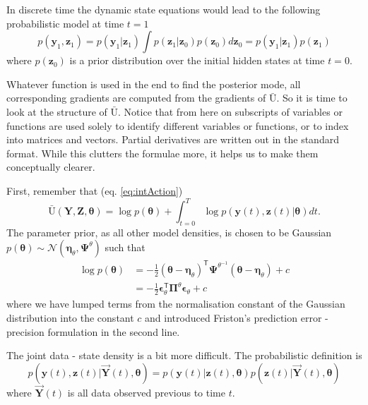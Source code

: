 \documentclass[a4paper,10pt]{article}
\newcommand{\bs}[1]{\mathbf{#1}}					%
\newcommand{\bgs}[1]{\boldsymbol{#1}}				%
\newcommand{\tr}{\mathsf{T}}				%
\newcommand{\eq}[1]{\begin{equation} #1 \end{equation}}%
\renewcommand{\ss}{z}         %
\newcommand{\so}{y}         %
\newcommand{\spe}{\epsilon} %
\renewcommand{\sp}{\theta}    %
\newcommand{\ps}{\bs{\ss}}    %
\newcommand{\po}{\bs{\so}}    %
\newcommand{\ppe}{\bgs{\spe}} %
\newcommand{\pp}{\bgs{\sp}} %
\newcommand{\Ps}{\bs{Z}}    %
\newcommand{\Po}{\bs{Y}}    %
\newcommand{\Ua}{\bar{\mathrm{U}}}		%
\newcommand{\N}{\mathcal{N}}			%
\newcommand{\Prec}{\bgs{\Pi}}			%
\begin{document}
In discrete time the dynamic state equations would lead to the following probabilistic model at time $t=1$
\eq{
    p(\po_1, \ps_1) = p(\po_1| \ps_1)\int p(\ps_1|\ps_0)p(\ps_0) d\ps_0 = p(\po_1| \ps_1)p(\ps_1)
}
where $p(\ps_0)$ is a prior distribution over the initial hidden states at time $t=0$.

Whatever function is used in the end to find the posterior mode, all corresponding gradients are computed from the gradients of $\Ua$. So it is time to look at the structure of $\Ua$. Notice that from here on subscripts of variables or functions are used solely to identify different variables or functions, or to index into matrices and vectors. Partial derivatives are written out in the standard format. While this clutters the formulae more, it helps us to make them conceptually clearer.

First, remember that (eq. \ref{eq:intAction})
\[
    \Ua(\Po,\Ps,\pp) = \log p(\pp) + \int_{t=0}^T \log p(\po(t),\ps(t)|\pp)dt.
\]
The parameter prior, as all other model densities, is chosen to be Gaussian $p(\pp)\sim \N(\bgs{\eta}_\sp,\bgs{\Psi}^\sp)$ such that 
\begin{align}
    \log p(\pp) &= -\frac{1}{2}(\pp - \bgs{\eta}_\sp)^\tr\bgs{\Psi}^{\sp^{-1}}(\pp - \bgs{\eta}_\sp) + c\\
    &= -\frac{1}{2}\ppe_\sp^\tr\Prec^{\sp}\ppe_\sp + c
\end{align}
where we have lumped terms from the normalisation constant of the Gaussian distribution into the constant $c$ and introduced Friston's prediction error - precision formulation in the second line.

The joint data - state density is a bit more difficult. The probabilistic definition is
\eq{
    p(\po(t),\ps(t)|\vec{\Po}(t),\pp) = p(\po(t)|\ps(t),\pp)p(\ps(t)|\vec{\Po}(t),\pp)
}
where $\vec{\Po}(t)$ is all data observed previous to time $t$.
\end{document}
